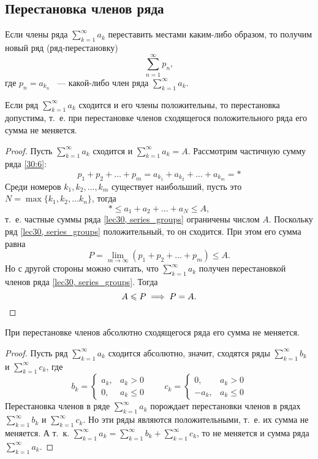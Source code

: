\documentclass[../../main.tex]{subfiles}
\begin{document}
\subsection{Перестановка членов ряда}
Если члены ряда $\sum\limits_{k = 1}^{\infty} a_k$
переставить местами каким-либо образом, то получим новый ряд (ряд-перестановку)
\begin{equation}
\label{30:6}
\sum\limits_{n = 1}^{\infty} p_n,
\end{equation}
где $p_n = a_{k_n}$ ~--- какой-либо член ряда $\sum\limits_{k = 1}^{\infty} 
a_k$.
\begin{thm}
	Если ряд $\sum\limits_{k = 1}^{\infty} a_k$ сходится и его члены положительны,
	то перестановка допустима, т.~е. при перестановке членов сходящегося
	положительного ряда его сумма не меняется.
\end{thm}
\begin{proof}
	Пусть $\sum\limits_{k = 1}^{\infty} a_k$  сходится и
	$\sum\limits_{k = 1}^{\infty} a_k = A$. Рассмотрим
	частичную сумму ряда \eqref{30:6}:
	\[p_1 + p_2 + \ldots + p_m = a_{k_1} + a_{k_2} + \ldots + a_{k_m} = *\]
	Среди номеров $k_1, k_2, \ldots, k_m$ существует 
	наибольший, пусть это
	$N = \max\{k_1, k_2, \ldots k_n\}$, тогда \[* \leq a_1 + a_2 + \ldots +
	a_N \leq A,\] т.~е. частные суммы ряда \eqref{lec30, series_groups}
	ограничены числом $A$. Поскольку ряд \eqref{lec30, series_groups}
	положительный, то он сходится. При этом его сумма равна
	\[P = \lim\limits_{m \to \infty}(p_1 + p_2 + \ldots + p_m) \leq A.\]
	Но с другой стороны можно считать, что $\sum\limits_{k = 1}^{\infty} a_k$
	получен перестановкой членов ряда \eqref{lec30, series_groups}. Тогда
	\[A \leq P \implies P = A. \qedhere\]
\end{proof}
\begin{crl*}
	При перестановке членов абсолютно сходящегося ряда его сумма не меняется.
\end{crl*}
\begin{proof}
		Пусть ряд $\sum\limits_{k = 1}^{\infty} a_k$ сходится абсолютно,
		значит, сходятся ряды $\sum\limits_{k = 1}^{\infty} b_k$ и
		$\sum\limits_{k = 1}^{\infty} c_k$, где\[b_k = \begin{cases}
			a_k,& a_k > 0\\
			0,& a_k \le 0
		  \end{cases} \qquad
		 c_k = \begin{cases}
			0,& a_k > 0\\
			-a_k,& a_k \le 0
		  \end{cases}\]
  Перестановка членов в ряде $\sum\limits_{k = 1}^{\infty} a_k$ порождает 
  перестановки членов
  в рядах  $\sum\limits_{k = 1}^{\infty} b_k$ и
  $\sum\limits_{k = 1}^{\infty} c_k$. Но эти ряды являются положительными,
  т.~е. их сумма не меняется. А т.~к. $\sum\limits_{k = 1}^{\infty} a_k
   = \sum\limits_{k = 1}^{\infty} b_k + \sum\limits_{k = 1}^{\infty} c_k$,
   то не меняется и сумма ряда $\sum\limits_{k = 1}^{\infty} a_k$.
\end{proof}
\end{document}
